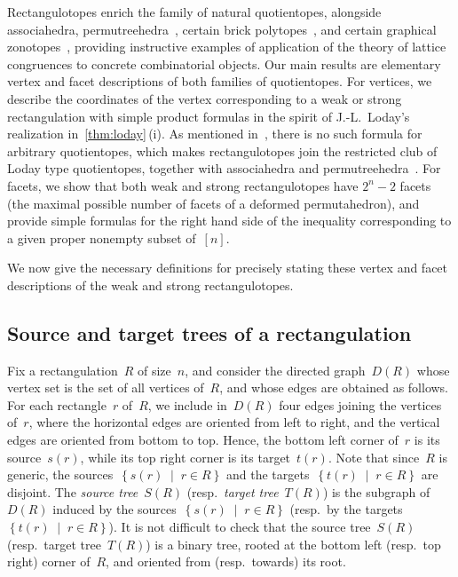 \documentclass{amsart}
\theoremstyle{definition}
\newcommand{\set}[2]{\left\{ #1 \;\middle|\; #2 \right\}} %
\newcommand{\darkblue}{\color{darkblue}} %
\newcommand{\defn}[1]{\textsl{\darkblue #1}} %
\begin{document}
Rectangulotopes enrich the family of natural quotientopes, alongside associahedra, permutreehedra~\cite{MR3856522}, certain brick polytopes~\cite{PilaudSantos-brickPolytopes, PilaudStump-brickPolytopes, Pilaud-brickAlgebra}, and certain graphical zonotopes~\cite{Pilaud-brickAlgebra, Pilaud-acyclicReorientationLattices}, providing instructive examples of application of the theory of lattice congruences to concrete combinatorial objects.
Our main results are elementary vertex and facet descriptions of both families of quotientopes.
For vertices, we describe the coordinates of the vertex corresponding to a weak or strong rectangulation with simple product formulas in the spirit of J.-L.~Loday's realization in~\cref{thm:loday}\,(i).
As mentioned in~\cite{PilaudSantosZiegler}, there is no such formula for arbitrary quotientopes, which makes rectangulotopes join the restricted club of Loday type quotientopes, together with associahedra and permutreehedra~\cite{MR3856522}.
For facets, we show that both weak and strong rectangulotopes have $2^n-2$ facets (the maximal possible number of facets of a deformed permutahedron), and provide simple formulas for the right hand side of the inequality corresponding to a given proper nonempty subset of~$[n]$.

We now give the necessary definitions for precisely stating these vertex and facet descriptions of the weak and strong rectangulotopes.


\subsection{Source and target trees of a rectangulation}
\label{subsec:sourceTargetTrees}

Fix a rectangulation~$R$ of size~$n$, and consider the directed graph~$D(R)$ whose vertex set is the set of all vertices of~$R$, and whose edges are obtained as follows.
For each rectangle~$r$ of~$R$, we include in~$D(R)$ four edges joining the vertices of~$r$, where the horizontal edges are oriented from left to right, and the vertical edges are oriented from bottom to top.
Hence, the bottom left corner of~$r$ is its source~$s(r)$, while its top right corner is its target~$t(r)$.
Note that since~$R$ is generic, the sources~$\set{s(r)}{r \in R}$ and the targets~$\set{t(r)}{r \in R}$ are disjoint.
The \defn{source tree}~$S(R)$ (resp.~\defn{target tree}~$T(R)$) is the subgraph of~$D(R)$ induced by the sources~$\set{s(r)}{r \in R}$ (resp.~by the targets~$\set{t(r)}{r \in R}$).
It is not difficult to check that the source tree~$S(R)$ (resp.~target tree~$T(R)$) is a binary tree, rooted at the bottom left (resp.~top right) corner of~$R$, and oriented from (resp.~towards) its root.
\end{document}
